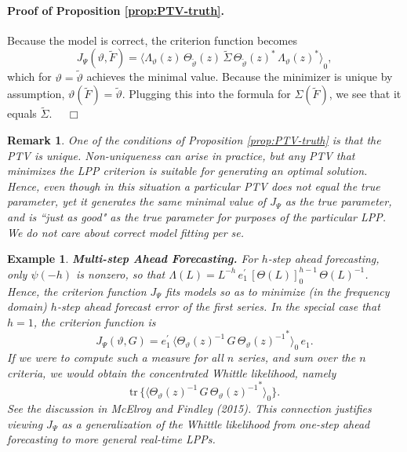 \documentclass[a4paper]{book}
\newtheorem{Remark}{Remark}
\newtheorem{Example}{Example}
\begin{document}
\paragraph{Proof of Proposition \ref{prop:PTV-truth}.}
 Because the model is correct, the criterion function becomes
\[
  J_{\Psi} (\vartheta, \widetilde{F}) = { \langle  \Lambda_{\vartheta   } (z)  \, 
   \Theta_{\widetilde{\vartheta}} (z) \, \widetilde{\Sigma} \, 
  {\Theta_{\widetilde{\vartheta}} (z)  }^* \, {  \Lambda_{\vartheta  } (z)  }^*
  \rangle }_0,
\]
 which for $\vartheta = \widetilde{\vartheta}$ achieves the minimal value.
  Because the minimizer is unique by assumption, 
  $\vartheta (\widetilde{F}) = \widetilde{\vartheta} $. 
  Plugging this into the formula
 for $\Sigma (\widetilde{F})$, we see that it equals $\widetilde{\Sigma}$.  $\quad \Box$

\vspace{.5cm}


\begin{Remark} \rm  
\label{rem:PTVunique}
 One of the conditions of Proposition \ref{prop:PTV-truth} is that the PTV is unique.  
 Non-uniqueness can arise in practice, but any PTV that minimizes the LPP criterion 
 is suitable for generating an optimal solution.  Hence, even though in this situation
 a particular PTV does not equal the true parameter, yet it generates the same minimal
 value of $J_{\Psi}$ as the true parameter, and is ``just as good" as the true parameter
 for purposes of the particular LPP.  We do not care about correct model fitting {\it per se}.
\end{Remark}


\begin{Example} {\bf Multi-step Ahead Forecasting.}  \rm
\label{exam:multi-step.fore.3}
 For $h$-step ahead forecasting, only $\psi (-h)$
  is nonzero, so that
 $\Lambda (L) =  L^{-h} \,  e_1^{\prime} \, {[ \Theta (L) ]}_0^{ h - 1} \, 
 { \Theta (L) }^{-1}$. 
  Hence, the criterion function $J_{\Psi} $ fits models so as to minimize
 (in the frequency domain)  $h$-step ahead forecast error of the first series. 
 In the special case that $h=1$, the criterion function is
\[
 J_{\Psi} (\vartheta, G) =  e_1^{\prime} \, { \langle   { \Theta_{\vartheta   } (z) }^{-1}  \,
  G \, { { \Theta_{\vartheta  } (z) }^{-1} }^*  \rangle }_0 \, e_1.
\]
   If we were to compute such a measure for all $n$ series, and sum over the $n$ criteria, we would obtain the concentrated Whittle 
 likelihood, namely
\[
  \mbox{tr} \, \{  { \langle   { \Theta_{\vartheta   } (z) }^{-1}  \, G \,
  { { \Theta_{\vartheta  } (z) }^{-1} }^*  \rangle }_0 \}.
\]
  See the discussion in McElroy and Findley (2015).  This connection justifies viewing $J_{\Psi}$ as a generalization of the Whittle
 likelihood from one-step ahead forecasting to more general real-time LPPs.
\end{Example}
\end{document}
